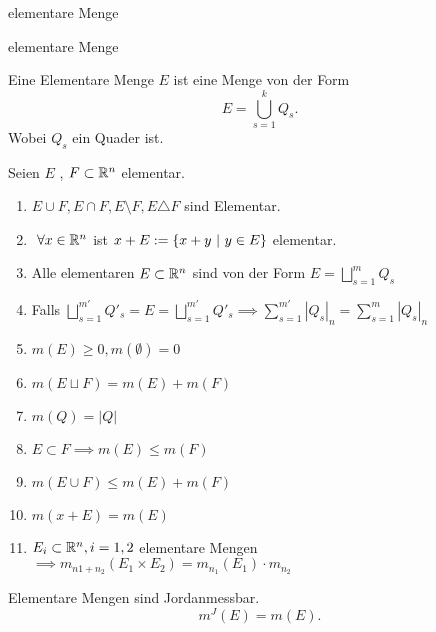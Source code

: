 \documentclass[class=article, crop=false]{standalone}
\begin{document}
\begin{zettel}{elementare Menge}
\begin{flashcard}[fbnseont]{elementare Menge}
	\begin{definition}
		Eine Elementare Menge $E$ ist eine Menge von der Form
		\[
			E = \bigcup_{s = 1}^k Q_s
		.\]
		Wobei $Q_s$ ein Quader ist.
	\end{definition}
\end{flashcard}

\begin{lemma}
	Seien $E$ , $F \subset  \mathbb{R} ^n$ elementar.
	\begin{enumerate}
		\item $E \cup  F, E \cap F, E \setminus F, E \triangle F$ sind Elementar.
		\item $\forall x \in  \R^n $ ist $x + E := \set{x + y}{y \in  E}$ elementar.
		\item Alle elementaren $E \subset  \mathbb{R}^n $ sind von der Form $E = \bigsqcup_{s = 1 }^m Q_s$
		\item Falls $\bigsqcup_{s = 1 }^{m'} Q'_s = E = \bigsqcup_{s = 1 }^{m'} Q'_s \implies \sum_{s = 1}^{m'} | Q_s|_n = \sum_{s = 1}^{m} | Q_s|_n$
		\item $m(E) \geq 0, m(\emptyset) = 0$
		\item $m (E \sqcup F) = m(E) + m(F)$
		\item $m(Q) = |Q|$
		\item $E \subset F \implies  m(E) \leq  m(F)$
		\item $ m (E \cup  F) \leq  m(E)+ m(F)$
		\item $m ( x + E) = m(E)$
		\item $E_i \subset \mathbb{R}^n , i = 1,2$ elementare Mengen $\implies m_{n1 + n_2}(E_1 \times  E_2) = m_{ n_1 }(E_1) \cdot  m_{n_2} $
	\end{enumerate}
\end{lemma}

\begin{corollary}
	Elementare Mengen sind Jordanmessbar.
	\[
		m^J(E)= m(E)
	.\]
\end{corollary}
\end{zettel}
\end{document}
